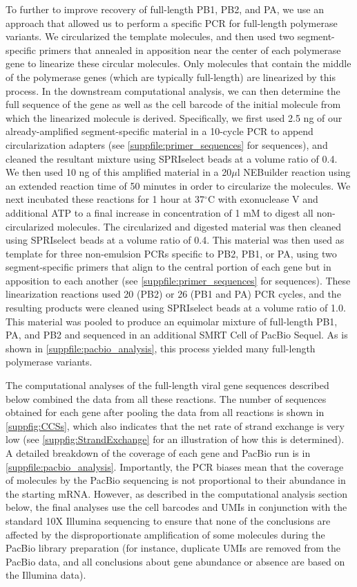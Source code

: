\documentclass[lineno]{asm-article}
\newcommand{\SUPPFILE}[1]{\autoref{suppfile:#1}}
\newcommand{\SUPPFIG}[1]{\autoref{suppfig:#1}}
\begin{document}
To further to improve recovery of full-length PB1, PB2, and PA, we use an approach that allowed us to perform a specific PCR for full-length polymerase variants.
We circularized the template molecules, and then used two segment-specific primers that annealed in apposition near the center of each polymerase gene to linearize these circular molecules.
Only molecules that contain the middle of the polymerase genes (which are typically full-length) are linearized by this process.
In the downstream computational analysis, we can then determine the full sequence of the gene as well as the cell barcode of the initial molecule from which the linearized molecule is derived.
Specifically, we first used 2.5 ng of our already-amplified segment-specific material in a 10-cycle PCR to append circularization adapters (see \SUPPFILE{primer_sequences} for sequences), and cleaned the resultant mixture using SPRIselect beads at a volume ratio of 0.4.
We then used 10 ng of this amplified material in a 20$\mu$l NEBuilder reaction using an extended reaction time of 50 minutes in order to circularize the molecules.
We next incubated these reactions for 1 hour at 37$^{\circ}$C with exonuclease V and additional ATP to a final increase in concentration of 1 mM to digest all non-circularized molecules.
The circularized and digested material was then cleaned using SPRIselect beads at a volume ratio of 0.4.
This material was then used as template for three non-emulsion PCRs specific to PB2, PB1, or PA, using two segment-specific primers that align to the central portion of each gene but in apposition to each another (see \SUPPFILE{primer_sequences} for sequences).
These linearization reactions used 20 (PB2) or 26 (PB1 and PA) PCR cycles, and the resulting products were cleaned using SPRIselect beads at a volume ratio of 1.0.
This material was pooled to produce an equimolar mixture of full-length PB1, PA, and PB2 and sequenced in an additional SMRT Cell of PacBio Sequel. 
As is shown in \SUPPFILE{pacbio_analysis}, this process yielded many full-length polymerase variants.

The computational analyses of the full-length viral gene sequences described below combined the data from all these reactions.
The number of sequences obtained for each gene after pooling the data from all reactions is shown in \SUPPFIG{CCSs}, which also indicates that the net rate of strand exchange is very low (see \SUPPFIG{StrandExchange} for an illustration of how this is determined).
A detailed breakdown of the coverage of each gene and PacBio run is in \SUPPFILE{pacbio_analysis}.
Importantly, the PCR biases mean that the coverage of molecules by the PacBio sequencing is not proportional to their abundance in the starting mRNA.
However, as described in the computational analysis section below, the final analyses use the cell barcodes and UMIs in conjunction with the standard 10X Illumina sequencing to ensure that none of the conclusions are affected by the disproportionate amplification of some molecules during the PacBio library preparation (for instance, duplicate UMIs are removed from the PacBio data, and all conclusions about gene abundance or absence are based on the Illumina data).
\end{document}
